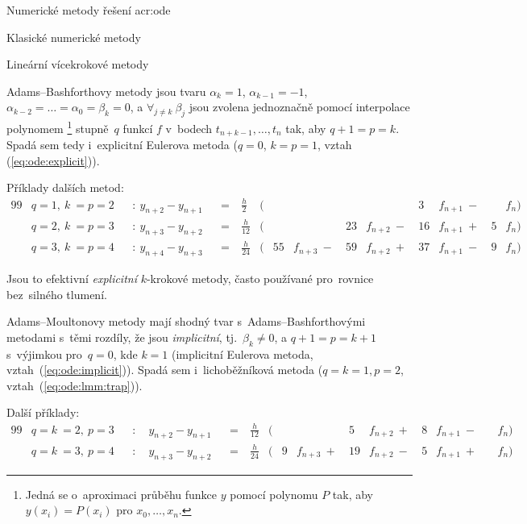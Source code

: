 \documentclass[thesis=M,czech]{FITthesis}[2012/06/26]
\newcommand{\acrlabel}[1]{acr:#1}
\newcommand{\acr}[1]{\acrshort{\acrlabel{#1}}}
\newcommand{\hl}[1]{\textit{#1}}
\newcommand{\rf}[1]{\ref{#1}}
\newcommand{\rfeq}[1]{(\rf{eq:#1})}
\begin{document}
\begin{section}{Numerické metody řešení \acr{ode}}
\begin{subsection}{Klasické numerické metody}
\begin{subsubsection}{Lineární vícekrokové metody}

\begin{paragraph}{Adams--Bashforthovy metody}
\label{p:search:ode:classic:lmm:adamsb}
jsou tvaru ${\alpha_{k} = 1}$, ${\alpha_{k-1} = -1}$,
$\alpha_{k-2} = \dots = \alpha_{0} = \beta_k = 0$,
a ${\forall_{j \neq k} \: \beta_{j}}$ jsou zvolena jednoznačně
pomocí interpolace polynomem%
\footnote{Jedná se o~aproximaci průběhu funkce $y$ pomocí polynomu $P$
tak, aby ${y(x_i) = P(x_i)}$ pro ${x_0, \dots, x_n}$.}
stupně~$q$ funkcí $f$ v~bodech ${t_{n+k-1}, \dots, t_{n}}$ tak,
aby ${q+1 = p = k}$.
Spadá sem tedy i~explicitní Eulerova metoda
(${q = 0}$, ${k = p = 1}$, vztah \rfeq{ode:explicit}).

Příklady dalších metod:
\begin{alignat*}{99}
   &q = 1, \: k~= p = 2 &&: \  y_{n+2} - y_{n+1} &&= \:
      & \frac{h}{2}\: & ( &    &         \: \: &    &         \: \:
      &  3 & f_{n+1} \:-\: &   & f_{n} ) \\
   &q = 2, \: k~= p = 3 &&: \  y_{n+3} - y_{n+2} &&= \:
      & \frac{h}{12}  & ( &    &         \: \: & 23 & f_{n+2} \:-\:
      & 16 & f_{n+1} \:+\: & 5 & f_{n} ) \\
   &q = 3, \: k~= p = 4 &&: \  y_{n+4} - y_{n+3} &&= \:
      & \frac{h}{24}  & ( & 55 & f_{n+3} \:-\: & 59 & f_{n+2} \:+\:
      & 37 & f_{n+1} \:-\: & 9 & f_{n} )
\end{alignat*}

Jsou to efektivní \hl{explicitní} $k$-krokové metody,
často používané pro~rovnice bez~silného tlumení.
\end{paragraph} %


\begin{paragraph}{Adams--Moultonovy metody}
\label{p:search:ode:classic:lmm:adamsm}
mají shodný tvar s~Adams--Bashforthovými metodami
s~těmi rozdíly, že jsou \hl{implicitní},
tj.~${\beta_k \neq 0}$,
a ${q+1 = p = k+1}$
s~výjimkou pro~${q = 0}$, kde ${k = 1}$
(implicitní Eulerova metoda, vztah~\rfeq{ode:implicit}).
Spadá sem i~lichoběžníková metoda
(${q = k = 1}, {p = 2}$, vztah~\rfeq{ode:lmm:trap}).

Další příklady:
\begin{alignat*}{99}
   &q = k~= 2, \: p = 3 &&: \quad y_{n+2} - y_{n+1} &&= \:
      & \frac{h}{12} & ( &   &         \: \: &  5 & f_{n+2} \:+\:
      & 8 & f_{n+1} \:-\: &   & f_{n} ) \\
   &q = k~= 3, \: p = 4 &&: \quad y_{n+3} - y_{n+2} &&= \:
      & \frac{h}{24} & ( & 9 & f_{n+3} \:+\: & 19 & f_{n+2} \:-\:
      & 5 & f_{n+1} \:+\: &   & f_{n} )
\end{alignat*}
\end{paragraph} %


\end{subsubsection}
\end{subsection}
\end{section}
\end{document}
